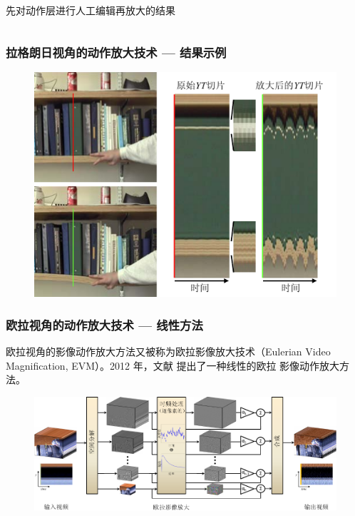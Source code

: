 \documentclass[xcolor=svgnames,serif,table,10pt]{beamer}
\begin{document}
\begin{frame}
\begin{columns}
    先对动作层进行人工编辑再放大的结果
  \end{columns}
\end{frame}

\begin{frame}
  \frametitle{拉格朗日视角的动作放大技术 --- 结果示例}
  \begin{figure}[htbp]
    \centering
    \includegraphics[width=.7\textwidth]{liu.pdf}
    \label{fig:liu}
  \end{figure}
\end{frame}

\begin{frame}
  \frametitle{欧拉视角的动作放大技术 --- 线性方法}
  欧拉视角的影像动作放大方法又被称为欧拉影像放大技术（Eulerian Video
  Magnification, EVM）。2012 年，文献 \cite{wu2012eulerian} 提出了一种线性的欧拉
  影像动作放大方法。
  \begin{figure}[htbp]
    \centering
    \includegraphics[width=.9\textwidth]{linear.pdf}
    \label{fig:linear}
  \end{figure}
\end{frame}
\end{document}
